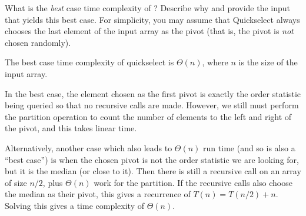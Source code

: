 \begin{prob}
    What is the \emph{best} case time complexity of ?
    Describe why and provide the input that yields this best case.
    For simplicity, you may assume that Quickselect always chooses the last element of the input
    array as the pivot (that is, the pivot is \emph{not} chosen randomly).

    \begin{soln}
        The best case time complexity of quickselect is $\Theta(n)$, where $n$ is the
        size of the input array.

        In the best case, the element chosen as the first pivot is exactly the
        order statistic being queried so that no recursive calls are made.  However, we still must perform the
        partition operation to count the number of elements to the left and
        right of the pivot, and this takes linear time.

        Alternatively, another case which also leads to $\Theta(n)$ run time (and so is
        also a ``best case'') is when the chosen pivot is not the order statistic we are
        looking for, but it is the median (or close to it). Then there is still a recursive
        call on an array of size $n/2$, plus $\Theta(n)$ work for the partition. If the
        recursive calls also choose the median as their pivot, this gives a recurrence of
        $T(n) = T(n/2) + n$. Solving this gives a time complexity of $\Theta(n)$.
    \end{soln}
\end{prob}
